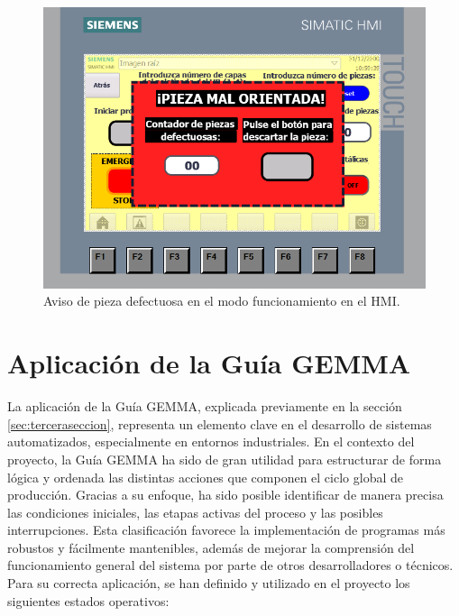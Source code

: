 \begin{figure}[h!]
  \includegraphics[width=15cm]{figs/HMI_descarte}
  \caption{\centering Aviso de pieza defectuosa en el modo funcionamiento en el HMI.}
  \label{fig:HMI_descarte}
\end{figure}

\section{Aplicación de la Guía GEMMA}
\label{sec:aplicacion_gemma}

La aplicación de la Guía GEMMA, explicada previamente en la sección \ref{sec:terceraseccion}, representa un elemento clave en el desarrollo de sistemas automatizados, especialmente en entornos industriales. En el contexto del proyecto, la Guía GEMMA ha sido de gran utilidad para estructurar de forma lógica y ordenada las distintas acciones que componen el ciclo global de producción. Gracias a su enfoque, ha sido posible identificar de manera precisa las condiciones iniciales, las etapas activas del proceso y las posibles interrupciones. Esta clasificación favorece la implementación de programas más robustos y fácilmente mantenibles, además de mejorar la comprensión del funcionamiento general del sistema por parte de otros desarrolladores o técnicos. Para su correcta aplicación, se han definido y utilizado en el proyecto los siguientes estados operativos:

